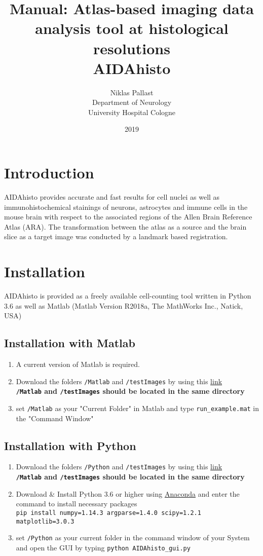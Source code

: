 \documentclass[12pt]{article}
\title{Manual: Atlas-based imaging data analysis tool at histological resolutions \\AIDAhisto}
\date{2019}
\author{Niklas Pallast\\ Department of Neurology \\ University Hospital Cologne}
\begin{document}
\maketitle
\section{Introduction}
AIDAhisto provides accurate and fast results for cell nuclei as well as immunohistochemical stainings of neurons, astrocytes and immune cells in the mouse brain with respect to the associated regions of the Allen Brain Reference Atlas (ARA). The transformation between the atlas as a source and the brain slice as a target image was conducted by a landmark based registration.   
\section{Installation}
AIDAhisto is provided as a freely available cell-counting tool written in Python 3.6 as well as Matlab (Matlab Version R2018a, The MathWorks Inc., Natick, USA)
\subsection{Installation with Matlab}
\begin{enumerate}
\item A current version of Matlab is required. 
\item Download the folders {\tt /Matlab} and {\tt /testImages} by using this \href{https://github.com/maswendt/AIDAhisto}{link} \\ \textbf{{\tt /Matlab} and {\tt /testImages} should be located in the same directory}
\item set  {\tt /Matlab} as your "Current Folder" in Matlab and type {\tt run\_example.mat} in the "Command Window"
\end{enumerate}
\subsection{Installation with Python}
\begin{enumerate}
	\item  Download the folders {\tt /Python} and {\tt /testImages} by using this \href{https://github.com/maswendt/AIDAhisto}{link} \\ \textbf{{\tt /Matlab} and {\tt /testImages} should be located in the same directory}
	\item Download \& Install Python 3.6 or higher using \href{https://www.anaconda.com/distribution/}{Anaconda} and enter the command to install necessary packages\\ {\tt pip install numpy=1.14.3 argparse=1.4.0 scipy=1.2.1 matplotlib=3.0.3}	
	\item set  {\tt /Python} as your current folder in the command window of your System and open the GUI by typing {\tt python AIDAhisto\_gui.py}
\end{enumerate}
	
\end{document}
